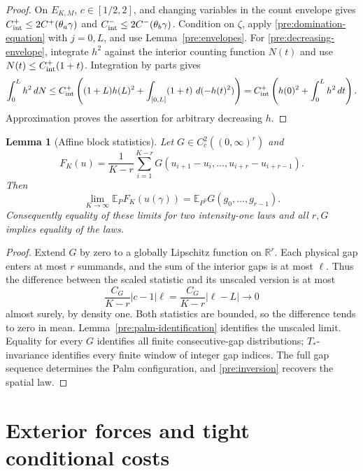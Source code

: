 \documentclass[11pt,reqno]{amsart}
\numberwithin{equation}{section}
\newtheorem{lemma}[theorem]{Lemma}
\theoremstyle{definition}
\newcommand{\R}{\mathbb R}
\newcommand{\E}{\mathbb E}
\newcommand{\1}{\mathbf 1}
\newcommand{\dd}{\,d}
\begin{document}
\begin{proof}
On $E_{K,M}$, $c\in[1/2,2]$, and changing variables in the count
envelope gives
$C_{\rm int}^+\le2C^+(\theta_a\gamma)$ and
$C_{\rm int}^-\le2C^-(\theta_b\gamma)$.
Condition on $\zeta$, apply \eqref{pre:domination-equation} with
$j=0,L$, and use Lemma~\ref{pre:envelopes}.
For \eqref{pre:decreasing-envelope}, integrate $h^2$ against the
interior counting function $N(t)$ and use
$N(t)\le C_{\rm int}^+(1+t)$. Integration by parts gives
\[
\int_0^Lh^2\dd N
\le C_{\rm int}^+\left((1+L)h(L)^2+
\int_{[0,L]}(1+t)\,\dd(-h(t)^2)\right)
=C_{\rm int}^+\left(h(0)^2+\int_0^Lh^2\dd t\right).
\]
Approximation proves the assertion for arbitrary decreasing $h$.
\end{proof}

\begin{lemma}[Affine block statistics]\label{pre:affine-statistics}
Let $G\in C_c^2((0,\infty)^r)$ and
\[
F_K(u)=\frac1{K-r}\sum_{i=1}^{K-r}
G(u_{i+1}-u_i,\ldots,u_{i+r}-u_{i+r-1}).
\]
Then
\begin{equation}\label{pre:affine-limit}
\lim_{K\to\infty}\E_P F_K(u(\gamma))
=\E_{P^0}G(g_0,\ldots,g_{r-1}).
\end{equation}
Consequently equality of these limits for two intensity-one laws and
all $r,G$ implies equality of the laws.
\end{lemma}

\begin{proof}
Extend $G$ by zero to a globally Lipschitz function on $\R^r$.
Each physical gap enters at most $r$ summands, and the sum of the
interior gaps is at most $\ell$. Thus the difference between the
scaled statistic and its unscaled version is at most
\[
\frac{C_G}{K-r}|c-1|\ell
=\frac{C_G}{K-r}|\ell-L|\longrightarrow0
\]
almost surely, by density one. Both statistics are bounded, so the
difference tends to zero in mean. Lemma~\ref{pre:palm-identification}
identifies the unscaled limit. Equality for every $G$ identifies all
finite consecutive-gap distributions; $T_*$-invariance identifies
every finite window of integer gap indices. The full gap sequence
determines the Palm configuration, and \eqref{pre:inversion} recovers
the spatial law.
\end{proof}


\section{Exterior forces and tight conditional costs}\label{for:section}\label{sec:forces}
\end{document}
